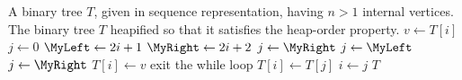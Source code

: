 
\begin{algorithmic}[1]
\Require A binary tree $T$, given in sequence representation, having
  $n > 1$ internal vertices.
\Ensure The binary tree $T$ heapified so that it satisfies the
  heap-order property.
  \State $v \gets T[i]$
  \State $j \gets 0$
  \While{$\MyTrue$}
    \State $\MyLeft \gets 2i + 1$
    \State $\MyRight \gets 2i + 2$
        \State $j \gets \MyRight$
      \Else
        \State $j \gets \MyLeft$
      \EndIf
      \State $j \gets \MyRight$
    \Else
      \State $T[i] \gets v$
      \State exit the while loop
    \EndIf
    \State $T[i] \gets T[j]$
    \State $i \gets j$
  \EndWhile
\EndFor
\State \Return $T$
\end{algorithmic}
